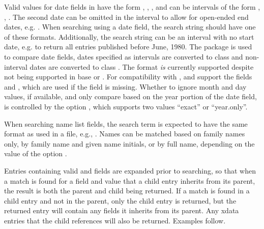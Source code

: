 \documentclass[article]{jss}\usepackage[]{graphicx}\usepackage[]{color}
\newcommand{\ourpkg}{\pkg{RefManageR}}
\begin{document}
Valid values for date fields in \Biblatex{} have the form , , , and can be intervals of the form , , .  The second date can be omitted in the interval to allow for open-ended end dates, e.g. .  When searching using a date field, the search string should have one of these formats.  Additionally, the search string can be an interval with no start date, e.g.  to return all entries published before June, 1980.  The  package \citep{lubridate} is used to compare date fields, dates specified as intervals are converted to class  and non-interval dates are converted to class .  The format  \emph{is} currently supported despite not being supported in base \R{} or .  For compatibility with \Bibtex{}, \Biblatex{} and \ourpkg{} support the fields  and , which are used if the  field is missing. Whether to ignore month and day values, if available, and only compare based on the year portion of the date field, is controlled by the option , which supports two values ``exact'' or ``year.only''.

When searching name list fields, the search term is expected to have the same format as used in a  file, e.g., .  Names can be matched based on family names only, by family name and given name initials, or by full name, depending on the value of the option .  

Entries containing valid  and  fields are expanded prior to searching, so that when a match is found for a field and value that a child entry inherits from its parent, the result is both the parent and child being returned.  If a match is found in a child entry and not in the parent, only the child entry is returned, but the returned entry will contain any fields it inherits from its parent.  Any xdata entries that the child references will also be returned.  Examples follow.
\end{document}

